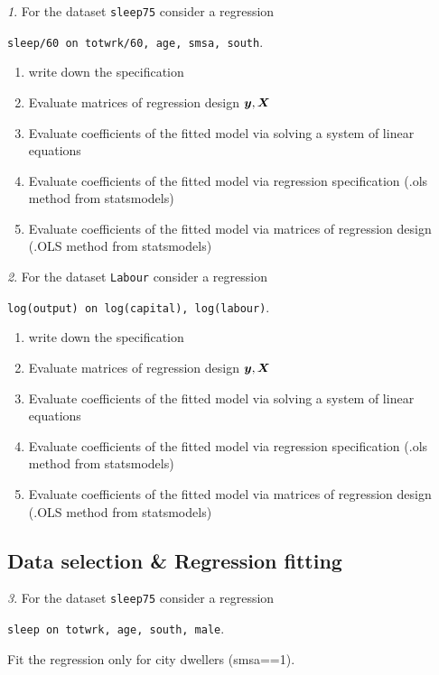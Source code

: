 \documentclass[12pt]{article}
\theoremstyle{remark}
\newtheorem{problem}{}[section]
\begin{document}
\begin{problem}
For the dataset \texttt{sleep75} consider a regression
\begin{center}
	\texttt{sleep/60 on totwrk/60, age, smsa, south}.
\end{center}
\begin{enumerate}
	\item write down the specification
	\item Evaluate matrices of regression design \({\bm y}, {\bm X}\)
	\item Evaluate coefficients of the fitted model via 
	solving a system of linear equations
	\item Evaluate coefficients of the fitted model via 
	regression specification (.ols method from statsmodels)
	\item Evaluate coefficients of the fitted model via 
	matrices of regression design (.OLS method from statsmodels)
\end{enumerate}
\end{problem}

\begin{problem}
For the dataset \texttt{Labour} consider a regression
\begin{center}
\texttt{log(output) on log(capital), log(labour)}.
\end{center}
\begin{enumerate}
	\item write down the specification
	\item Evaluate matrices of regression design \({\bm y}, {\bm X}\)
	\item Evaluate coefficients of the fitted model via 
	solving a system of linear equations
	\item Evaluate coefficients of the fitted model via 
	regression specification (.ols method from statsmodels)
	\item Evaluate coefficients of the fitted model via 
	matrices of regression design (.OLS method from statsmodels)
\end{enumerate}
\end{problem}

\subsection*{Data selection \& Regression fitting}

\begin{problem}
For the dataset \texttt{sleep75} consider a regression
\begin{center}
	\texttt{sleep on totwrk, age, south, male}.
\end{center}
Fit the regression only for city dwellers (smsa==1).
\end{problem}
\end{document}

